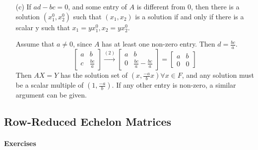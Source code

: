 \documentclass{article}
\begin{document}
\begin{enumerate}[listparindent=\parindent]
\begin{enumerate}
\item[(c)] If \(ad - bc = 0\), and some entry of \(A\) is different from 0, then there is a solution
    \( (x_1^0, x_2^0) \) such that \( (x_1, x_2) \) is a solution if and only if there is a scalar y such that
    \( x_1 = yx_1^0, x_2 = yx_2^0 \).

Assume that \(a \neq 0\), since \(A\) has at least one non-zero entry. Then \(d = \frac{bc}{a}\).
\[
    \begin{bmatrix}
        a & b \\
        c & \frac{bc}{a}
    \end{bmatrix}
    \xrightarrow{(2)}
    \begin{bmatrix}
        a & b \\
        0 & \frac{bc}{a} - \frac{bc}{a}
    \end{bmatrix}
    =
    \begin{bmatrix}
        a & b \\
        0 & 0
    \end{bmatrix}
\]
Then \(AX = Y\) has the solution set of \( (x, \frac{-a}{b}x) \forall x \in F \),
and any solution must be a scalar multiple of \( (1, \frac{-a}{b}) \).
If any other entry is non-zero, a similar argument can be given.
\end{enumerate}
\end{enumerate}

\subsection{Row-Reduced Echelon Matrices}
\paragraph{Exercises}
\end{document}
